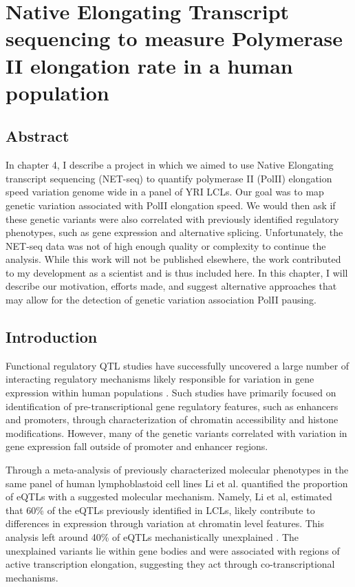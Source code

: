\chapter{Native Elongating Transcript sequencing to measure Polymerase II elongation rate in a human population}\label{ch:netseq}

\section{Abstract}\label{ch04-abstract}


In chapter 4, I describe a project in which we aimed to use Native Elongating transcript sequencing (NET-seq) to quantify polymerase II (PolII) elongation speed variation genome wide in a panel of YRI LCLs. Our goal was to map genetic variation associated with PolII elongation speed. We would then ask if these genetic variants were also correlated with previously identified regulatory phenotypes, such as gene expression and alternative splicing. Unfortunately, the NET-seq data was not of high enough quality or complexity to continue the analysis. While this work will not be published elsewhere, the work contributed to my development as a scientist and is thus included here. In this chapter, I will describe our motivation, efforts made, and suggest alternative approaches that may allow for the detection of genetic variation association PolII pausing.  



\clearpage

\section{Introduction}\label{ch04-introduction}

Functional regulatory QTL studies have successfully uncovered a large number of interacting regulatory mechanisms likely responsible for variation in gene expression within human populations \citep{li_rna_2016, McVicker2013, degner_dnase_2012, gaffney_dissecting_2012, battle_genomic_2015}. Such studies have primarily focused on identification of pre-transcriptional gene regulatory features, such as enhancers and promoters, through characterization of chromatin accessibility and histone modifications. However, many of the genetic variants correlated with variation in gene expression fall outside of promoter and enhancer regions.  


Through a meta-analysis of previously characterized molecular phenotypes in the same panel of human lymphoblastoid cell lines Li et al. quantified the proportion of eQTLs with a suggested molecular mechanism. Namely, Li et al, estimated that 60\% of the eQTLs previously identified in LCLs, likely contribute to differences in expression through variation at chromatin level features. This analysis left around 40\% of eQTLs mechanistically unexplained \citep{li_rna_2016}. The unexplained variants lie within gene bodies and were associated with regions of active transcription elongation, suggesting they act through co-transcriptional mechanisms. 

